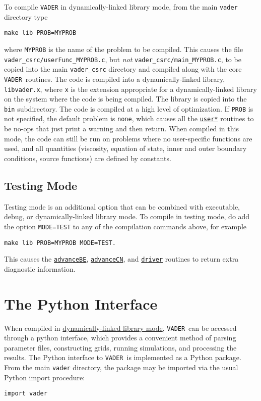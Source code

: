 \documentclass[12pt]{article}
\newcommand{\vader}{\texttt{VADER}}
\begin{document}
To compile \texttt{VADER} in dynamically-linked library mode, from the main \texttt{vader} directory type
\begin{verbatim}
make lib PROB=MYPROB
\end{verbatim}
where \verb=MYPROB= is the name of the problem to be compiled. This causes the file\\ \verb=vader_csrc/userFunc_MYPROB.c=, but \textit{not} \verb=vader_csrc/main_MYPROB.c=,  to be copied into the main \verb=vader_csrc= directory and compiled along with the core \vader\ routines. The code is compiled into a dynamically-linked library, \verb=libvader.x=, where \verb=x= is the extension appropriate for a dynamically-linked library on the system where the code is being compiled. The library is copied into the \verb=bin= subdirectory. The code is compiled at a high level of optimization. If \verb=PROB= is not specified, the default problem is \verb=none=, which causes all the \hyperref[ssec:userC]{\texttt{user*}} routines to be no-ops that just print a warning and then return. When compiled in this mode, the code can still be run on problems where no user-specific functions are used, and all quantities (viscosity, equation of state, inner and outer boundary conditions, source functions) are defined by constants.

\subsection{Testing Mode}
\label{ssec:testingMode}

Testing mode is an additional option that can be combined with executable, debug, or dynamically-linked library mode. To compile in testing mode, do add the option \verb!MODE=TEST! to any of the compilation commands above, for example
\begin{verbatim}
make lib PROB=MYPROB MODE=TEST.
\end{verbatim}
This causes the \hyperref[sssec:advanceBE]{\texttt{advanceBE}}, \hyperref[sssec:advanceCN]{\texttt{advanceCN}}, and \hyperref[sssec:driver]{\texttt{driver}} routines to return extra diagnostic information.


\section{The Python Interface}
\label{sec:python}

When compiled in \hyperref[ssec:dylibmode]{dynamically-linked library mode}, \vader\ can be accessed through a python interface, which provides a convenient method of parsing parameter files, constructing grids, running simulations, and processing the results. The Python interface to \vader\ is implemented as a Python package. From the main \texttt{vader} directory, the package may be imported via the usual Python import procedure:
\begin{verbatim}
import vader
\end{verbatim}
\end{document}
